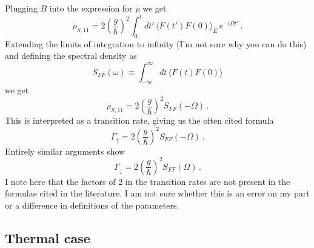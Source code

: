 Plugging $B$ into the expression for $\dot{\rho}$ we get
\begin{equation}
\dot{\rho}_{S,11} =
2 \left( \frac{g}{\hbar} \right)^2 \int_0^t dt' \, \langle F(t') F(0) \rangle_E \, e^{-i \Omega t'} \, .
\end{equation}
Extending the limits of integration to infinity (I'm not sure why you can do this) and defining the spectral density as
\begin{equation}
S_{FF}(\omega) \equiv \int_{-\infty}^\infty dt \, \langle F(t) F(0) \rangle
\end{equation}
we get
\begin{equation}
\dot{\rho}_{S,11} = 2 \left( \frac{g}{\hbar} \right)^2 S_{FF}(-\Omega) \, .
\end{equation}
This is interpreted as a transition rate, giving us the often cited formula
\begin{equation}
\Gamma_\uparrow = 2 \left(\frac{g}{\hbar} \right)^2 S_{FF}(-\Omega) \, .
\end{equation}
Entirely similar arguments show
\begin{equation}
\Gamma_\downarrow = 2 \left( \frac{g}{\hbar} \right)^2 S_{FF}(\Omega) \, .
\end{equation}
I note here that the factors of 2 in the transition rates are not present in the formulae cited in the literature.
I am not sure whether this is an error on my part or a difference in definitions of the parameters.


\subsection{Thermal case}



